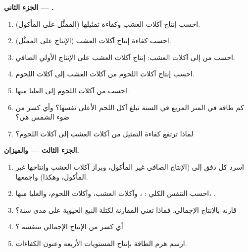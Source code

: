 \begin{problem}
\medskip
\noindent\textbf{الجزء الثاني --- .}
\begin{enumerate}[resume]
  \item احسب إنتاج آكلات العشب وكفاءة تمثيلها
        (الممثَّل على المأكول).
  \item احسب كفاءة إنتاج آكلات العشب
        (الإنتاج على الممثَّل).
  \item احسب  من  إلى آكلات العشب:
        إنتاج آكلات العشب على الإنتاج الأولي الصافي.
  \item احسب إنتاج آكلات اللحوم 
        من آكلات العشب إلى آكلات اللحوم.
  \item احسب  من آكلات اللحوم إلى العليا منها.
  \item كم طاقة في المتر المربع في السنة تبلغ  آكل اللحم
        الأعلى نفسها؟ وأي كسر من ضوء الشمس هي؟
  \item لماذا ترتفع كفاءة التمثيل من آكلات العشب إلى
        آكلات اللحوم؟
\end{enumerate}

\medskip
\noindent\textbf{الجزء الثالث ---  والميزان.}
\begin{enumerate}[resume]
  \item اسرد كل دفق إلى  (الإنتاج الصافي غير المأكول،
        وبراز آكلات العشب وإنتاجها غير المأكول، وهكذا)
        واجمعها.
  \item احسب التنفس الكلي : ،
        وآكلات العشب، وآكلات اللحوم، والعليا منها، .
  \item قارنه بالإنتاج الإجمالي. فماذا تعني المقارنة
        لكتلة النبع الحيوية على مدى سنة؟
  \item أي كسر من الإنتاج الإجمالي تتنفسه
        ؟
  \item ارسم هرم الطاقة بإنتاج المستويات الأربعة
        وعنون الكفاءات.
\end{enumerate}


\end{problem}

